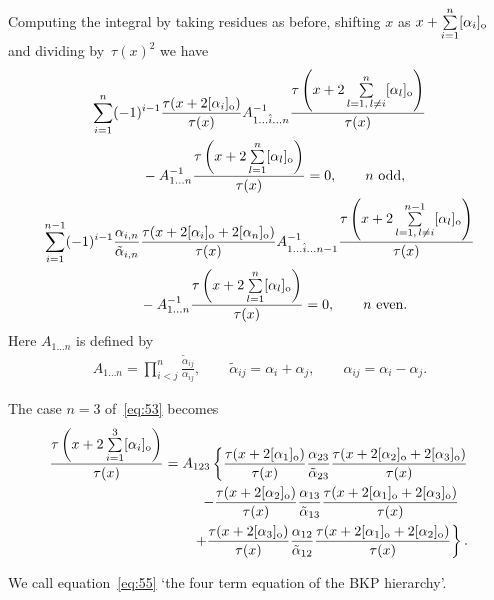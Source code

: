 \documentclass[11pt]{article}
\begin{document}
Computing the integral by taking residues as before, shifting $x$ as $x+\sum\limits_{i=1}^{n}[\alpha_i]_{\rm o}$ and
divi\-ding by~$\tau(x)^2$ we have
\begin{gather}
\sum_{i=1}^{n}(-1)^{i-1}\frac{\tau(x+2[\alpha_i]_{\rm o})}{\tau(x)}A_{1\dots\hat{i}\dots n}^{-1}
\frac{\tau\left(x+2\sum\limits_{l=1,\, l\neq i}^n[\alpha_l]_{\rm o}\right)}{\tau(x)}\nonumber
\\
\qquad
{}-A_{1\dots n}^{-1}\frac{\tau\left(x+2\sum\limits_{l=1}^{n}[\alpha_l]_{\rm o}\right)}{\tau(x)}=0,\qquad  n \ \text{odd},
\label{eq:53}
\\
\sum_{i=1}^{n-1}(-1)^{i-1}\frac{\alpha_{i,n}}{\tilde{\alpha}_{i,n}}
\frac{\tau(x+2[\alpha_i]_{\rm o}+2[\alpha_n]_{\rm o})}{\tau(x)}A_{1\dots\hat{i}\dots n-1}^{-1}
\frac{\tau\left(x+2\sum\limits_{l=1,\, l\neq i}^{n-1}[\alpha_l]_{\rm o}\right)}{\tau(x)}\nonumber
\\
\qquad
{} -A_{1\dots n}^{-1}\frac{\tau\left(x+2\sum\limits_{l=1}^{n}[\alpha_l]_{\rm o}\right)}{\tau(x)}=0,\qquad  n \ \text{even}.
\label{eq:54}
\end{gather}
Here $A_{1\dots n}$ is def\/ined by
\begin{gather*}
A_{1\dots n}=\prod_{i<j}^{n}\frac{\tilde{\alpha}_{ij}}{\alpha_{ij}},\qquad \tilde{\alpha}_{ij}
=\alpha_i+\alpha_j,\qquad \alpha_{ij}=\alpha_i-\alpha_j.
\end{gather*}
\begin{example}\label{example3}
The case $n=3$ of~\eqref{eq:53} becomes
\begin{gather}
\frac{\tau\left(x+2\sum\limits_{i=1}^{3}[\alpha_i]_{\rm o}\right)}{\tau(x)}=A_{123}\left\{\frac{\tau(x+2[\alpha_1]_{\rm o})}{\tau(x)}
\frac{\alpha_{23}}{\tilde{\alpha}_{23}}\frac{\tau(x+2[\alpha_2]_{\rm o}+2[\alpha_3]_{\rm o})}{\tau(x)}\right.
\nonumber
\\
\hskip36mm-\frac{\tau(x+2[\alpha_2]_{\rm o})}{\tau(x)}\frac{\alpha_{13}}{\tilde{\alpha}_{13}}
\frac{\tau(x+2[\alpha_1]_{\rm o}+2[\alpha_3]_{\rm o})}{\tau(x)}\nonumber
\\
\hskip36mm\left.
+\frac{\tau(x+2[\alpha_3]_{\rm o})}{\tau(x)}\frac{\alpha_{12}}{\tilde{\alpha}_{12}}
\frac{\tau(x+2[\alpha_1]_{\rm o}+2[\alpha_2]_{\rm o})}{\tau(x)}\right\}.
\label{eq:55}
\end{gather}
\end{example}
We call equation~\eqref{eq:55} `the four term equation of the BKP hierarchy'.
\end{document}
